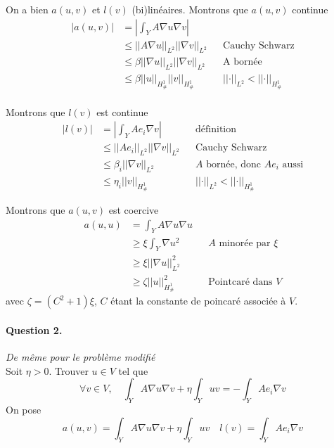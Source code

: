 \documentclass[11pt]{article}
\newcommand{\norm}[1]{\left|\left|#1\right|\right|}
\newcommand{\question}[2]{\paragraph{Question #1.}\textit{#2} \\}
\newcommand{\Hd}{H^1_{\#}}
\begin{document}
On a bien $a(u,v)$ et $l(v)$ (bi)linéaires. Montrons que $a(u,v)$ continue 
\begin{align}
  \label{eq:ac}
  \big|a(u,v)\big| &= \left| \int_Y A \nabla u \nabla v \right| \\
                   &\leq \norm{A\nabla u}_{L^2} \norm{\nabla v}_{L^2} && \mbox{Cauchy Schwarz} \\
                   &\leq \beta \norm{\nabla u}_{L^2} \norm{\nabla v}_{L^2} && \mbox{A bornée} \\
                   &\leq \beta \norm{u}_{\Hd} \norm{v}_{\Hd} && \norm{\cdot}_{L^2}<\norm{\cdot}_{\Hd} \\
\end{align}

Montrons que $l(v)$ est continue
\begin{align}
  \label{eq:ac}
  \big|l(v)\big| &= \left| \int_Y A e_i \nabla v \right|  && \text{définition} \\
                 &\leq \norm{Ae_i}_{L^2} \norm{\nabla v}_{L^2} && \text{Cauchy Schwarz} \\
                 &\leq \beta_i \norm{\nabla v}_{L^2} && \text{$A$ bornée, donc $A e_i$ aussi} \\
                 &\leq \eta_i \norm{v}_{\Hd} && \norm{\cdot}_{L^2}<\norm{\cdot}_{\Hd}
\end{align}

Montrons que $a(u,v)$ est coercive
\begin{align}
  \label{eq:co}
  a(u,u) &= \int_Y A \nabla u  \nabla u \\
         &\geq \xi \int_Y \nabla u^2  && \text{$A$ minorée par $\xi$}\\
         &\geq \xi \norm{\nabla u}^2_{L^2} \\
         &\geq \zeta \norm{u}^2_{\Hd} && \text{Pointcaré dans $V$} 
\end{align}
avec $\zeta = (C^2+1) \xi$, $C$ étant la constante de poincaré associée à $V$.


\question{2}{De même pour le problème modifié}

Soit $\eta>0$. Trouver $u \in V$ tel que
\begin{equation}
  \forall v \in V, \quad \int_Y A \nabla u \nabla v + \eta \int_Y u v = - \int_Y A e_i \nabla v
\end{equation}
On pose
\begin{equation}
  a(u,v) = \int_Y A \nabla u \nabla v + \eta \int_Y u v \quad
  l(v) = \int_Y A e_i \nabla v
\end{equation}
\end{document}

